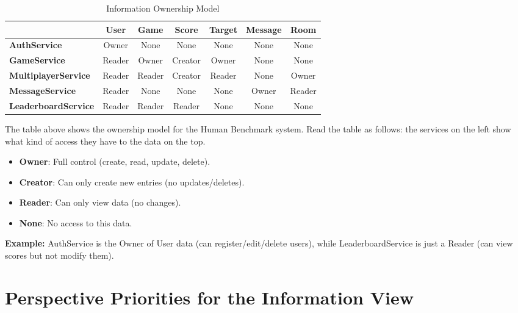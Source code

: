 \begin{table}[H]
    \centering
    \caption{Information Ownership Model}
    \label{tab:ownership}
    \begin{tabular}{lcccccc}
        \hline
                                    & \textbf{User} & \textbf{Game} & \textbf{Score} & \textbf{Target} & \textbf{Message} & \textbf{Room} \\
        \hline
        \textbf{AuthService}        & Owner         & None          & None           & None            & None             & None          \\
        \textbf{GameService}        & Reader        & Owner         & Creator        & Owner           & None             & None          \\
        \textbf{MultiplayerService} & Reader        & Reader        & Creator        & Reader          & None             & Owner         \\
        \textbf{MessageService}     & Reader        & None          & None           & None            & Owner            & Reader        \\
        \textbf{LeaderboardService} & Reader        & Reader        & Reader         & None            & None             & None          \\
        \hline
    \end{tabular}
\end{table}

The table above shows the ownership model for the Human Benchmark system.
Read the table as follows: the services on the left show what kind of access they have to the data on the top.

\begin{itemize}
    \item \textbf{Owner}: Full control (create, read, update, delete).
    \item \textbf{Creator}: Can only create new entries (no updates/deletes).
    \item \textbf{Reader}: Can only view data (no changes).
    \item \textbf{None}: No access to this data.
\end{itemize}

\textbf{Example:} AuthService is the Owner of User data (can register/edit/delete users), while LeaderboardService is just a Reader (can view scores but not modify them).

\section{Perspective Priorities for the Information View}

